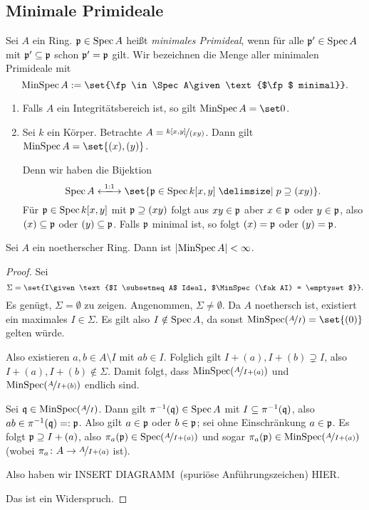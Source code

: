 \documentclass[12pt,a4paper]{scrartcl}
\theoremstyle{cplain}
\theoremstyle{cdef}
\begin{document}
\subsection{Minimale Primideale}
\begin{defi} Sei $A$ ein Ring. $\mathfrak{p}\in \operatorname{Spec} A$ heißt \emph{minimales Primideal}, wenn für alle $\mathfrak{p}'\in \operatorname{Spec} A$ mit $\mathfrak{p}'\subseteq \mathfrak{p}$ schon $\mathfrak{p}' = \mathfrak{p}$ gilt. Wir bezeichnen die Menge aller minimalen Primideale mit \[\MinSpec A := \set{\fp\in\Spec A\given \text{$\fp$ minimal}}.\]
\end{defi}
\begin{bsp}
	\leavevmode
	\begin{enumerate}
		\item Falls $A$ ein Integritätsbereich ist, so gilt $ \MinSpec A = \set 0$.
		\item Sei $k$ ein Körper. Betrachte $A = \nicefrac{k[x,y]}{(xy)}$. Dann gilt $\MinSpec A = \set{(x), (y)}$.
		
		Denn wir haben die Bijektion \[\Spec A \xlongleftrightarrow{1:1}\set {\fp\in\Spec k[x,y]\given p\supseteq (xy)}.\]
		Für $\mathfrak{p}\in \operatorname{Spec} k[x,y]$ mit $\mathfrak{p}\supseteq (xy)$ folgt aus  $xy\in \mathfrak{p}$ aber $ x\in \mathfrak{p}$ oder $y \in\mathfrak{p}$, also $(x)\subseteq \mathfrak{p}$ oder $(y)\subseteq \mathfrak{p}$. Falls $\mathfrak{p}$ minimal ist, so folgt $(x) = \mathfrak{p}$ oder $(y) = \mathfrak{p}$.
	\end{enumerate}
\end{bsp}
\begin{satz}
	Sei $A$ ein noetherscher Ring. Dann ist $\lvert\operatorname{MinSpec} A\rvert<\infty$.
\end{satz}
\begin{proof}
	Sei \[\Sigma = \set{I\given \text{$I \subsetneq A$ Ideal, $\MinSpec(\fak AI) = \emptyset$}}.\] Es genügt, $\Sigma = \emptyset$ zu zeigen. Angenommen, $\Sigma \neq \emptyset$. Da $A$ noethersch ist, existiert ein maximales $I\in \Sigma$. Es gilt also $I\notin \operatorname{Spec} A$, da sonst $\MinSpec(\fak{A}I) = \set {(0)}$ gelten würde. 
	
	Also existieren $a,b\in A\setminus I$ mit $ab\in I$. Folglich gilt $I+(a), I+(b)\supsetneq I$, also $I+(a), I+(b)\notin \Sigma$. Damit folgt, dass $\operatorname{MinSpec}(\nicefrac{A}{I+(a)})$ und $ \operatorname{MinSpec}(\nicefrac{A}{I+(b)})$ endlich sind.
	
	Sei $\mathfrak{q}\in\operatorname{MinSpec}(\nicefrac{A}{I})$. Dann gilt $\pi^{-1}(\mathfrak{q})\in \operatorname{Spec} A$ mit $I\subseteq \pi^{-1}(\mathfrak{q})$, also $ab\in \pi^{-1}(\mathfrak{q}) =: \mathfrak{p}$. Also gilt $a\in \mathfrak{p}$ oder $b\in \mathfrak{p}$; sei ohne Einschränkung $a\in \mathfrak{p}$. Es folgt $\mathfrak{p}\supseteq I+(a)$, also $\pi_a(\mathfrak{p}) \in\operatorname{Spec}(\nicefrac{A}{I+(a)})$ und sogar $\pi_{a}(\mathfrak{p}) \in \operatorname{MinSpec}(\nicefrac{A}{I+(a)})$ (wobei $\pi_a\colon A\to \nicefrac{A}{I+(a)}$ ist).
	
	Also haben wir
	INSERT \glqq DIAGRAMM\grqq\ (spuriöse Anführungszeichen) HIER.
	
	Das ist ein Widerspruch.
\end{proof}
\end{document}
